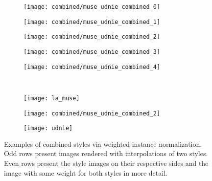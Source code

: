 \begin{figure}
	\vspace{0.1cm}
	\begin{subfigure}{0.18\textwidth}
		\texttt{[image: combined/muse\_udnie\_combined\_0]}
	\end{subfigure}
	\begin{subfigure}{0.18\textwidth}
		\texttt{[image: combined/muse\_udnie\_combined\_1]}
	\end{subfigure}
	\begin{subfigure}{0.18\textwidth}
		\texttt{[image: combined/muse\_udnie\_combined\_2]}
	\end{subfigure}
	\begin{subfigure}{0.18\textwidth}
		\texttt{[image: combined/muse\_udnie\_combined\_3]}
	\end{subfigure}
	\begin{subfigure}{0.18\textwidth}
		\texttt{[image: combined/muse\_udnie\_combined\_4]}
	\end{subfigure}\\
	\vspace{0.1cm}
	\begin{subfigure}[t]{0.1\textwidth}
		\vskip 0pt
		\texttt{[image: la\_muse]}
	\end{subfigure}
	\begin{subfigure}[t]{0.4\textwidth}
		\vskip 0pt
		\texttt{[image: combined/muse\_udnie\_combined\_2]}
	\end{subfigure}
	\begin{subfigure}[t]{0.1\textwidth}
		\vskip 0pt
		\texttt{[image: udnie]}
	\end{subfigure}
	\caption[Examples of combined styles via weighted instance normalization.]{Examples of combined styles via weighted instance normalization. Odd rows present images rendered with interpolations of two styles. Even rows present the style images on their respective sides and the image with same weight for both styles in more detail.\label{fig:weightedinstancenorm}}
\end{figure}